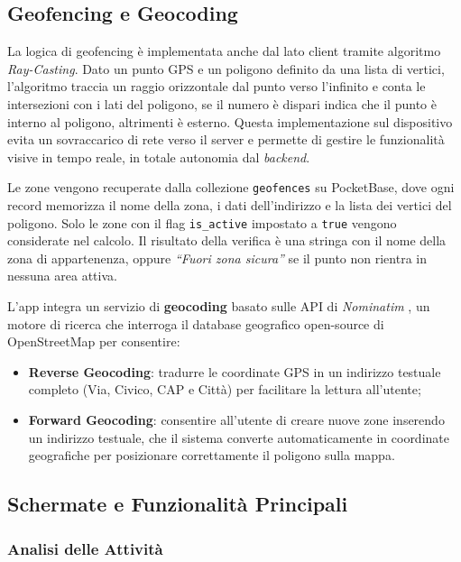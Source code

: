 \documentclass[12pt,a4paper]{article}
\begin{document}
\subsection{Geofencing e Geocoding}

La logica di geofencing è implementata anche dal lato client tramite algoritmo \mbox{\textit{Ray-Casting}}. 
Dato un punto GPS e un poligono definito da una lista di vertici, l'algoritmo traccia un raggio orizzontale dal punto
verso l'infinito e conta le intersezioni con i lati del poligono, se il numero è dispari
indica che il punto è interno al poligono, altrimenti è esterno. 
Questa implementazione sul dispositivo evita un sovraccarico di rete verso il server 
e permette di gestire le funzionalità visive in tempo reale, in totale autonomia dal \textit{backend}.

Le zone vengono recuperate dalla collezione \texttt{geofences} su PocketBase, dove
ogni record memorizza il nome della zona, i dati dell'indirizzo e la lista dei vertici
del poligono. Solo le zone con il flag \texttt{is\_active} impostato a \texttt{true}
vengono considerate nel calcolo. Il risultato della verifica è una stringa con il nome
della zona di appartenenza, oppure \textit{``Fuori zona sicura''} se il punto non
rientra in nessuna area attiva. 

L'app integra un servizio di \textbf{geocoding} 
basato sulle API di \textit{Nominatim} \cite{nominatim},
un motore di ricerca che interroga il database geografico 
open-source di OpenStreetMap per consentire:
\begin{itemize}
  \item \textbf{Reverse Geocoding}: tradurre le coordinate GPS in un indirizzo testuale completo 
  (Via, Civico, CAP e Città) per facilitare la lettura all'utente;
  \item \textbf{Forward Geocoding}: consentire all'utente di creare nuove zone inserendo 
  un indirizzo testuale, che il sistema converte automaticamente in coordinate geografiche 
  per posizionare correttamente il poligono sulla mappa.
\end{itemize}

\subsection{Schermate e Funzionalità Principali}

\subsubsection{Analisi delle Attività}
\end{document}
